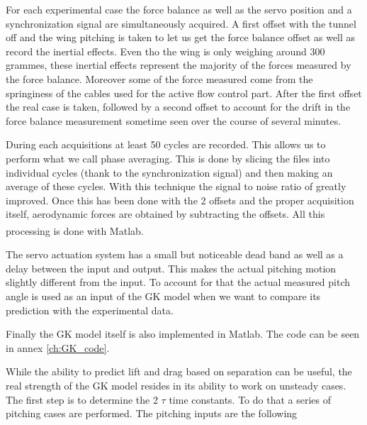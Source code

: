 \par For each experimental case the force balance as well as the servo position and a synchronization signal are simultaneously acquired.
A first offset with the tunnel off and the wing pitching is taken to let us get the force balance offset as well as record the inertial effects.
Even tho the wing is only weighing around 300 grammes, these inertial effects represent the majority of the forces measured by the force balance.
Moreover some of the force measured come from the springiness of the cables used for the active flow control part.
After the first offset the real case is taken, followed by a second offset to account for the drift in the force balance measurement sometime seen over the course of several minutes.

\par During each acquisitions at least 50 cycles are recorded.
This allows us to perform what we call phase averaging.
This is done by slicing the files into individual cycles (thank to the synchronization signal) and then making an average of these cycles.
With this technique the signal to noise ratio of greatly improved.
Once this has been done with the 2 offsets and the proper acquisition itself, aerodynamic forces are obtained by subtracting the offsets.
All this processing is done with Matlab\textsuperscript{\textregistered}. 

\par The servo actuation system has a small but noticeable dead band as well as a delay between the input and output.
This makes the actual pitching motion slightly different from the input.
To account for that the actual measured pitch angle is used as an input of the GK model when we want to compare its prediction with the experimental data.

\par Finally the GK model itself is also implemented in Matlab.
The code can be seen in annex \ref{ch:GK_code}.



\FloatBarrier


\par While the ability to predict lift and drag based on separation can be useful, the real strength of the GK model resides in its ability to work on unsteady cases.
The first step is to determine the 2 $\tau$ time constants. 
To do that a series of pitching cases are performed. 
The pitching inputs are the following

